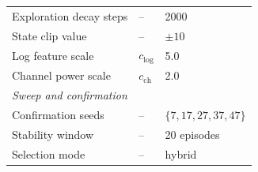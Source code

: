 \begin{table}[!h]
\begin{tabular}{lll}
        Exploration decay steps & -- & 2000 \\
        State clip value & -- & $\pm 10$ \\
        Log feature scale & $c_{\log}$ & 5.0 \\
        Channel power scale & $c_{\text{ch}}$ & 2.0 \\[4pt]
        \multicolumn{3}{l}{\textit{Sweep and confirmation}} \\
        Confirmation seeds & -- & $\{7, 17, 27, 37, 47\}$ \\
        Stability window & -- & 20 episodes \\
        Selection mode & -- & hybrid \\
        \bottomrule
    \end{tabular}
\end{table}
